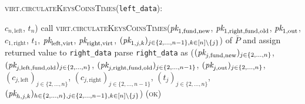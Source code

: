 \begin{center}
\begin{processbox}{\textsc{virt}.\textsc{circulateKeysCoinsTimes}(\texttt{left\_data}):}
\begin{algorithmic}[1]
          $c_{n, \mathrm{left}}$, $t_n$)
        \EndIf
      \Else \: 
        \State call \textsc{virt.circulateKeysCoinsTimes}($\textit{pk}_{1, \mathrm{fund},
        \mathrm{new}}$, $\textit{pk}_{1, \mathrm{right}, \mathrm{fund}, \mathrm{old}}$,
        $\textit{pk}_{1, \mathrm{out}}$, $c_{1, \mathrm{right}}$, $t_1$,
        $\textit{pk}_{\mathrm{left}, \mathrm{virt}}$, $\textit{pk}_{\mathrm{right},
        \mathrm{virt}}$, $(\textit{pk}_{1, j, k})_{j \in \{2, \dots, n-1\}, k \in [n]
        \setminus \{j\}}$) of $\bar{P}$ and assign returned value to
        \texttt{right\_data}
        \State parse \texttt{right\_data} as ($(\textit{pk}_{j, \mathrm{fund},
        \mathrm{new}})_{j \in \{2, \dots, n\}}$, $(\textit{pk}_{j, \mathrm{left},
        \mathrm{fund}, \mathrm{old}})_{j \in \{2, \dots, n\}}$, $(\textit{pk}_{j,
        \mathrm{right}, \mathrm{fund}, \mathrm{old}})_{j \in \{2, \dots,
        n-1\}}$, $(\textit{pk}_{j, \mathrm{out}})_{j \in \{2, \dots, n\}}$, $(c_{j,
        \mathrm{left}})_{j \in \{2, \dots, n\}}$, $(c_{j, \mathrm{right}})_{j
        \in \{2, \dots, n-1\}}$, $(t_j)_{j \in \{2, \dots, n\}}$, $(\textit{pk}_{h, j,
        k})_{h \in \{2, \dots, n\}, j \in \{2, \dots, n-1\}, k \in [n] \setminus
        \{j\}}$)
        \State \Return (\textsc{ok})
      \EndIf
    \end{algorithmic}
  \end{processbox}
  \label{code:virtual-layer:circulate-keys-and-coins}
\end{center} \ \\

